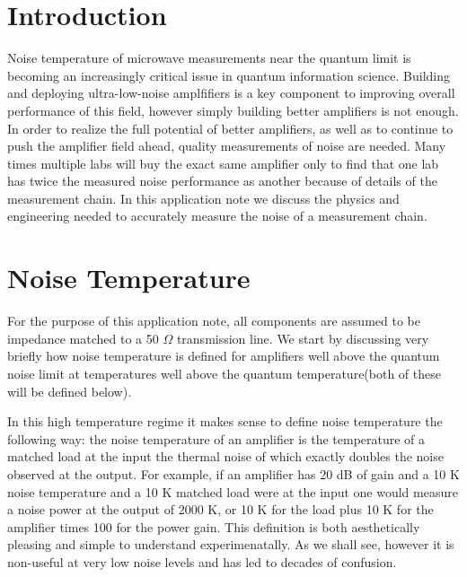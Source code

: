 \documentclass[11pt]{article}
\begin{document}
\section{
Introduction}



	Noise temperature of microwave measurements near the quantum limit is becoming an increasingly critical issue in quantum information science.  Building and deploying ultra-low-noise amplfifiers is a key component to improving overall performance of this field, however simply building better amplifiers is not enough.  In order to realize the full potential of better amplifiers, as well as to continue to push the amplifier field ahead, quality measurements of noise are needed.   Many times multiple labs will buy the exact same amplifier only to find that one lab has twice the measured noise performance as another because of details of the measurement chain.  In this application note we discuss the physics and engineering needed to accurately measure the noise of a measurement chain.


\section{
Noise Temperature}



    		For the purpose of this application note, all components are assumed to be impedance matched to a 50 $\Omega$ transmission line.  We start by discussing very briefly how noise temperature is defined for amplifiers well above the quantum noise limit at temperatures well above the quantum temperature(both of these will be defined below). 





    	In this high temperature regime it makes sense to define noise temperature the following way:  the noise temperature of an amplifier is the temperature of a matched load at the input the thermal noise of which exactly doubles the noise observed at the output.  For example, if an amplifier has 20 dB of gain and a 10 K noise temperature and a 10 K matched load were at the input one would measure a noise power at the output of 2000 K, or 10 K for the load plus 10 K for the amplifier times 100 for the power gain.  This definition is both aesthetically pleasing and simple to understand experimenatally.  As we shall see, however it is non-useful at very low noise levels and has led to decades of confusion.  
\end{document}
